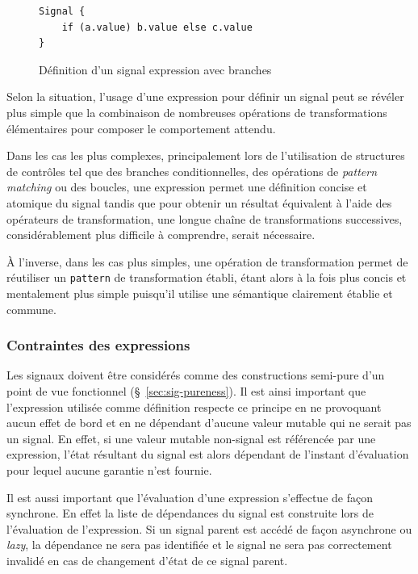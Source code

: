 \begin{figure}[!h]
	\begin{lstlisting}
Signal {
	if (a.value) b.value else c.value
}
	\end{lstlisting}
	\caption{Définition d'un signal expression avec branches}
	\label{fig:signal-expr-branches}
\end{figure}

Selon la situation, l'usage d'une expression pour définir un signal peut se révéler plus simple que la combinaison de nombreuses opérations de transformations élémentaires pour composer le comportement attendu.

Dans les cas les plus complexes, principalement lors de l'utilisation de structures de contrôles tel que des branches conditionnelles, des opérations de \emph{pattern matching} ou des boucles, une expression permet une définition concise et atomique du signal tandis que pour obtenir un résultat équivalent à l'aide des opérateurs de transformation, une longue chaîne de transformations successives, considérablement plus difficile à comprendre, serait nécessaire.

À l'inverse, dans les cas plus simples, une opération de transformation permet de réutiliser un \texttt{pattern} de transformation établi, étant alors à la fois plus concis et mentalement plus simple puisqu'il utilise une sémantique clairement établie et commune.

\subsubsection{Contraintes des expressions}

Les signaux doivent être considérés comme des constructions semi-pure d'un point de vue fonctionnel (§~\ref{sec:sig-pureness}). Il est ainsi important que l'expression utilisée comme définition respecte ce principe en ne provoquant aucun effet de bord et en ne dépendant d'aucune valeur mutable qui ne serait pas un signal. En effet, si une valeur mutable non-signal est référencée par une expression, l'état résultant du signal est alors dépendant de l'instant d'évaluation pour lequel aucune garantie n'est fournie.

Il est aussi important que l'évaluation d'une expression s'effectue de façon synchrone. En effet la liste de dépendances du signal est construite lors de l'évaluation de l'expression. Si un signal parent est accédé de façon asynchrone ou \emph{lazy}, la dépendance ne sera pas identifiée et le signal ne sera pas correctement invalidé en cas de changement d'état de ce signal parent.

